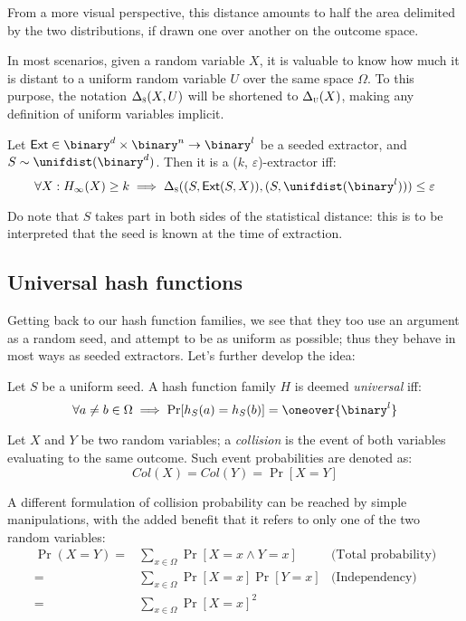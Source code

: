 From a more visual perspective, this distance amounts to half the area delimited by the two distributions, if drawn one over another on the outcome space.


In most scenarios, given a random variable $X$, it is valuable to know how much it is distant to a uniform random variable $U$ over the same space $\Omega$. To this purpose, the notation $\Delta_\textsc{s}(X, U)$ will be shortened to $\Delta_\textsc{u}(X)$, making any definition of uniform variables implicit.

\begin{definition}
    Let $\ext \in \binary^d \times \binary^n \to \binary^l$ be a seeded extractor, and $S \sim \unifdist(\binary^d)$. Then it is a ($k$, $\varepsilon$)-extractor iff:
    \[
        \forall X : H_{\infty}(X) \geq k \implies \statdist((S, \ext(S, X)), (S, \unifdist(\binary^l))) \leq \varepsilon
    \]
\end{definition}

Do note that $S$ takes part in both sides of the statistical distance: this is to be interpreted that the seed is known at the time of extraction.


\subsection{Universal hash functions}

Getting back to our hash function families, we see that they too use an argument as a random seed, and attempt to be as uniform as possible; thus they behave in most ways as seeded extractors. Let's further develop the idea:

\begin{definition}
    Let $S$ be a uniform seed. A hash function family $H$ is deemed \emph{universal} iff:
    \[
        \forall a \neq b \in \Omega \implies \Pr[h_S(a) = h_S(b)] = \oneover{\binary^l}
    \]
\end{definition}

\begin{definition}
    Let $X$ and $Y$ be two \iid{} random variables; a \emph{collision} is the event of both variables evaluating to the same outcome. Such event probabilities are denoted as:
    \[
        Col(X) = Col(Y) = \Pr[X = Y]
    \]
\end{definition}

A different formulation of collision probability can be reached by simple manipulations, with the added benefit that it refers to only one of the two \iid{} random variables:
\begin{align*}
    \Pr(X = Y) =& \sum_{x \in \Omega} \Pr[X = x \wedge Y = x] & \text{(Total probability)} \\
               =& \sum_{x \in \Omega} \Pr[X = x] \Pr[Y = x]   & \text{(Independency)}      \\
               =& \sum_{x \in \Omega} \Pr[X = x]^2                                         \\
\end{align*}

